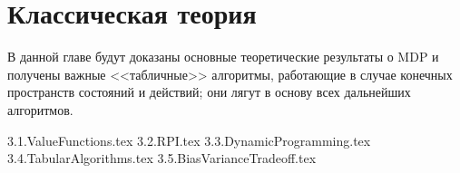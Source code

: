 \chapter{Классическая теория}\label{classictheorychapter}

В данной главе будут доказаны основные теоретические результаты о MDP и получены важные <<табличные>> алгоритмы, работающие в случае конечных пространств состояний и действий; они лягут в основу всех дальнейших алгоритмов. 

{3.1.ValueFunctions.tex}
{3.2.RPI.tex}
{3.3.DynamicProgramming.tex}
{3.4.TabularAlgorithms.tex}
{3.5.BiasVarianceTradeoff.tex}